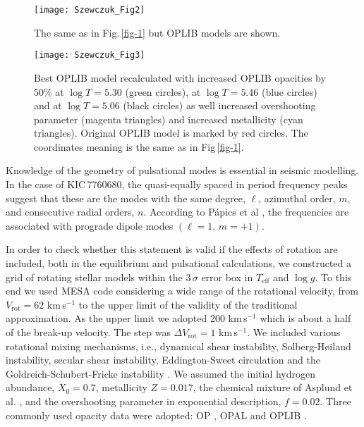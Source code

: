 \documentclass[epj,twocolumn]{webofc}
\begin{document}
\begin{figure*}
\centering
\texttt{[image: Szewczuk\_Fig2]}
\caption{The same as in Fig.\,\ref{fig-1} but OPLIB models are shown.}
\label{fig-2}       %
\end{figure*}

\begin{figure*}
\centering
\texttt{[image: Szewczuk\_Fig3]}
\caption{Best OPLIB model recalculated with increased OPLIB opacities by 50\% at $\log T=5.30$
         (green circles), at $\log T=5.46$ (blue circles) and at $\log T=5.06$ (black circles)
         as well increased overshooting parameter (magenta triangles) and increased metallicity
         (cyan triangles). Original OPLIB model is marked by red circles.
         The coordinates meaning is the same as in Fig\,\ref{fig-1}.}
\label{fig-3}       %
\end{figure*}

\label{sec-1}

Knowledge of the geometry of pulsational modes is essential in seismic modelling.
In the case of KIC\,7760680, the quasi-equally spaced in period frequency peaks suggest that these are
the modes with the same degree, $\ell$, azimuthal order, $m$, and consecutive radial orders, $n$.
According to P{\'a}pics et al \citep{Papics2015}, the frequencies are associated with
prograde dipole modes $\left(\ell=1,\,m=+1\right)$.

In order to check whether this statement is valid if the effects of rotation are included, both in the
equilibrium and pulsational calculations, we constructed a grid of rotating stellar models within
the $3\,\sigma$ error box in $T_\mathrm{eff}$ and $\log g$.
To this end we used  MESA code \cite{Paxton2011,Paxton2013,Paxton2015} considering a wide range
of the rotational velocity, from $V_\mathrm{rot}=62$ km\,s$^{-1}$ to the upper limit
of the validity of the traditional approximation.
As the upper limit we adopted 200 km\,s$^{-1}$ which is about a half of the  break-up velocity.
The step was $\Delta V_\mathrm{rot}=1$ km\,s$^{-1}$.
We included various rotational mixing mechanisms, i.e., dynamical shear instability, Solberg-H{\o}iland instability, secular shear instability,
Eddington-Sweet circulation and the Goldreich-Schubert-Fricke instability
\cite[see ][]{2000ApJ...528..368H,2005ApJ...626..350H,Paxton2013}.
We assumed the initial hydrogen abundance, $X_{0}=0.7$, metallicity $Z=0.017$, the chemical mixture
of Asplund et al. \cite{AGSS09}, and the overshooting parameter in exponential description, $f=0.02$.
Three commonly used opacity data were adopted: OP \cite{Seaton2005}, OPAL
\cite{OPAL1996} and OPLIB \cite{OPLIB2015,Colgan2016}.
\end{document}
